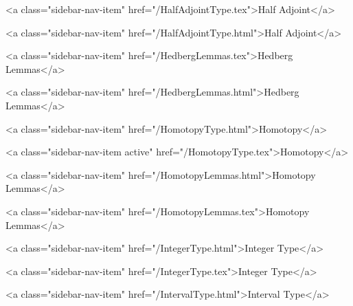       
        
          <a class="sidebar-nav-item" href="/HalfAdjointType.tex">Half Adjoint</a>
        
      
    
      
        
          <a class="sidebar-nav-item" href="/HalfAdjointType.html">Half Adjoint</a>
        
      
    
      
        
          <a class="sidebar-nav-item" href="/HedbergLemmas.tex">Hedberg Lemmas</a>
        
      
    
      
        
          <a class="sidebar-nav-item" href="/HedbergLemmas.html">Hedberg Lemmas</a>
        
      
    
      
        
          <a class="sidebar-nav-item" href="/HomotopyType.html">Homotopy</a>
        
      
    
      
        
          <a class="sidebar-nav-item active" href="/HomotopyType.tex">Homotopy</a>
        
      
    
      
        
          <a class="sidebar-nav-item" href="/HomotopyLemmas.html">Homotopy Lemmas</a>
        
      
    
      
        
          <a class="sidebar-nav-item" href="/HomotopyLemmas.tex">Homotopy Lemmas</a>
        
      
    
      
        
          <a class="sidebar-nav-item" href="/IntegerType.html">Integer Type</a>
        
      
    
      
        
          <a class="sidebar-nav-item" href="/IntegerType.tex">Integer Type</a>
        
      
    
      
        
          <a class="sidebar-nav-item" href="/IntervalType.html">Interval Type</a>
        
      
    
